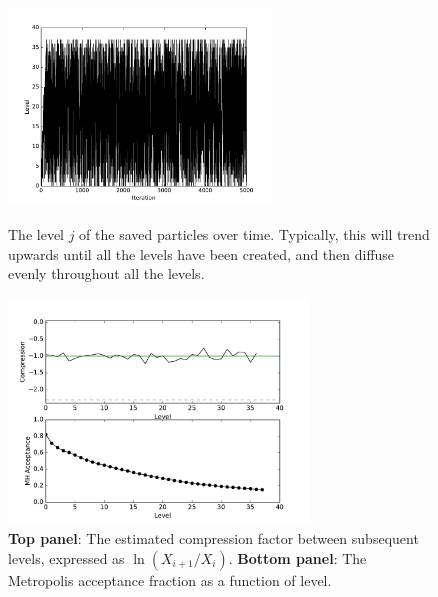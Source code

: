 \documentclass[article]{jss}
\begin{document}
\begin{figure}[ht!]
\begin{minipage}{7.5cm}
\centering
\includegraphics[width=7cm]{figures/fig1.pdf}
\caption{The level $j$ of the saved particles over time.
Typically, this will trend upwards until all the levels have
been created, and then diffuse evenly throughout all the levels.
\label{fig:fig1}}
\end{minipage}\hspace{0.5cm}
\begin{minipage}{7.5cm}
\centering
\includegraphics[width=8cm]{figures/fig2.pdf}
\caption{{\bf Top panel}: The estimated compression factor between subsequent
levels, expressed as $\ln(X_{i+1}/X_{i})$. {\bf Bottom panel}:
The Metropolis acceptance fraction as a function of level.
\label{fig:fig2}}
\end{minipage}
\end{figure}
\end{document}
